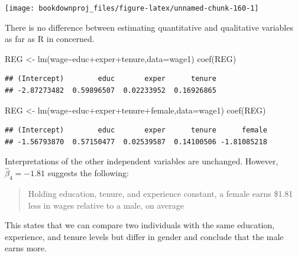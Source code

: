 \documentclass[
]{book}
\newenvironment{Shaded}{\begin{snugshade}}{\end{snugshade}}
\newcommand{\AttributeTok}[1]{\textcolor[rgb]{0.77,0.63,0.00}{#1}}
\newcommand{\FunctionTok}[1]{\textcolor[rgb]{0.00,0.00,0.00}{#1}}
\newcommand{\NormalTok}[1]{#1}
\newcommand{\OtherTok}[1]{\textcolor[rgb]{0.56,0.35,0.01}{#1}}
\newcommand{\SpecialCharTok}[1]{\textcolor[rgb]{0.00,0.00,0.00}{#1}}
\begin{document}
\begin{center}\texttt{[image: bookdownproj\_files/figure-latex/unnamed-chunk-160-1]} \end{center}

There is no difference between estimating quantitative and qualitative variables as far as R in concerned.

\begin{Shaded}
\begin{Highlighting}[]
\NormalTok{REG }\OtherTok{\textless{}{-}} \FunctionTok{lm}\NormalTok{(wage}\SpecialCharTok{\textasciitilde{}}\NormalTok{educ}\SpecialCharTok{+}\NormalTok{exper}\SpecialCharTok{+}\NormalTok{tenure,}\AttributeTok{data=}\NormalTok{wage1)}
\FunctionTok{coef}\NormalTok{(REG)}
\end{Highlighting}
\end{Shaded}

\begin{verbatim}
## (Intercept)        educ       exper      tenure 
## -2.87273482  0.59896507  0.02233952  0.16926865
\end{verbatim}

\begin{Shaded}
\begin{Highlighting}[]
\NormalTok{REG }\OtherTok{\textless{}{-}} \FunctionTok{lm}\NormalTok{(wage}\SpecialCharTok{\textasciitilde{}}\NormalTok{educ}\SpecialCharTok{+}\NormalTok{exper}\SpecialCharTok{+}\NormalTok{tenure}\SpecialCharTok{+}\NormalTok{female,}\AttributeTok{data=}\NormalTok{wage1)}
\FunctionTok{coef}\NormalTok{(REG)}
\end{Highlighting}
\end{Shaded}

\begin{verbatim}
## (Intercept)        educ       exper      tenure      female 
## -1.56793870  0.57150477  0.02539587  0.14100506 -1.81085218
\end{verbatim}

Interpretations of the other independent variables are unchanged. However, \(\hat{\beta}_4 = -1.81\) suggests the following:

\begin{quote}
Holding education, tenure, and experience constant, a female earns \$1.81 less in wages relative to a male, on average
\end{quote}

This states that we can compare two individuals with the same education, experience, and tenure levels but differ in gender and conclude that the male earns more.
\end{document}
